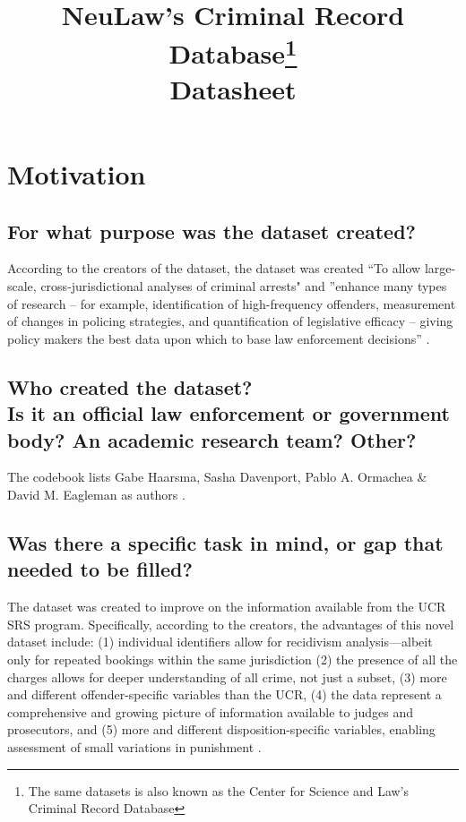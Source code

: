 \documentclass[letterpaper, 10 pt, conference]{ieeeconf}  %
\title{\LARGE \bf
NeuLaw's Criminal Record Database\footnote{The same datasets is also known as the Center for Science and Law’s Criminal Record Database} \\{\color{blue}Datasheet}
}
\newcommand{\subtitle}[1]{{\\ \small \normalfont \color{purple} #1}}
\begin{document}
\maketitle
\thispagestyle{empty}
\pagestyle{empty}

\section{Motivation}

\subsection{For what purpose was the dataset created?}

According to the creators of the dataset, the dataset was created ``To allow large-scale, cross-jurisdictional analyses of criminal arrests" and ''enhance many types of research -- for example, identification of high-frequency offenders, measurement of changes in policing strategies, and quantification of legislative efficacy -- giving policy makers the best data upon which to base law enforcement decisions'' \cite{ormachea2015new}.

\subsection{Who created the dataset? \subtitle{Is it an official law enforcement or government body? An academic research team? Other?}}

The codebook lists Gabe Haarsma, Sasha Davenport, Pablo A. Ormachea & David M. Eagleman as authors \cite{Neulaw}.


\subsection{Was there a specific task in mind, or gap that needed to be filled?}

The dataset was created to improve on the information available from the UCR SRS program. Specifically, according to the creators, the advantages of this novel dataset include: (1) individual identifiers allow for recidivism analysis—albeit only for repeated bookings within the same
jurisdiction (2) the presence of all the charges allows
for deeper understanding of all crime, not just a subset,
(3) more and different offender-specific variables than
the UCR, (4) the data represent a comprehensive and
growing picture of information available to judges and
prosecutors, and (5) more and different disposition-specific
variables, enabling assessment of small variations in
punishment \cite{ormachea2015new}.
\end{document}
